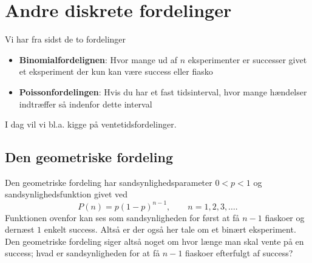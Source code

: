 
\section{Andre diskrete fordelinger}
Vi har fra sidst de to fordelinger
\begin{itemize}
  \item \textbf{Binomialfordelignen}: Hvor mange ud af $n$ eksperimenter er successer givet et eksperiment der kun kan være success eller fiasko
  \item \textbf{Poissonfordelingen}: Hvis du har et fast tidsinterval, hvor mange hændelser indtræffer så indenfor dette interval
\end{itemize}
I dag vil vi bl.a. kigge på ventetidsfordelinger.

\subsection{Den geometriske fordeling}
Den geometriske fordeling har sandsynlighedsparameter $0 < p < 1$ og sandsynlighedsfunktion givet ved
\[ 
P(n) = p(1-p)^{n-1}, \qquad n = 1, 2, 3, \ldots 
.\]
Funktionen ovenfor kan ses som sandsynligheden for først at få $n-1$ fiaskoer og dernæst $1$ enkelt success. Altså er der også her tale om et binært eksperiment. Den geometriske fordeling siger altså noget om hvor længe man skal vente på en success; hvad er sandsynligheden for at få $n-1$ fiaskoer efterfulgt af success?

